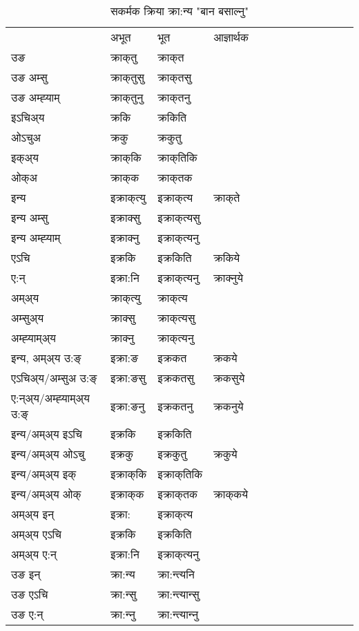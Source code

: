 \begin{table}[H]
\label{akt.vt} \centering
\caption{सकर्मक क्रिया  क्रा:न्य  "बान बसाल्नु"  }
\begin{tabular}{l|l|l|l|l|l|l|l|l|l|l|l|l}  \toprule
&अभूत & भूत & आज्ञार्थक \\ 
उङ &क्राक्‌तु &क्राक्‌त \\ 
उङ अम्सु&क्राक्‌तुसु &क्राक्‌तसु \\ 
उङ अम्ह्‍याम्&क्राक्‌तुनु &क्राक्‌तनु \\ 
इऽचिअ्य &क्रकि &क्रकिति   \\ 
ओऽचुअ        &क्रकु &क्रकुतु   \\ 
इक्अ्य&क्राक्‌कि &क्राक्‌तिकि   \\ 
ओक्अ &क्राक्‌क &क्राक्‌तक   \\ 
इन्य & इक्राक्‌त्यु  & इक्राक्‌त्य &क्राक्‌ते  \\ 
इन्य अम्सु& इक्राक्सु  & इक्राक्‌त्यसु   \\ 
इन्य अम्ह्‍याम्& इक्राक्‍नु  & इक्राक्‌त्यनु   \\ 
एऽचि & इक्रकि & इक्रकिति &क्रकिये    \\ 
ए:न् & इक्रा:नि  & इक्राक्‌त्यनु &क्राक्‍नुये  \\ 
अम्अ्य & क्राक्‌त्यु  & क्राक्‌त्य  \\ 
अम्सुअ्य & क्राक्सु & क्राक्‌त्यसु  \\ 
अम्ह्‍याम्अ्य & क्राक्‍नु  & क्राक्‌त्यनु \\ 
\midrule
इन्य, अम्अ्य उ:ङ्‌ &इक्रा:ङ &इक्रकत &क्रकये \\ 
एऽचिअ्य/अम्सुअ उ:ङ्‌ &इक्रा:ङसु &इक्रकतसु &क्रकसुये \\ 
ए:न्अ्य/अम्ह्‍याम्अ्य उ:ङ्‌ &इक्रा:ङनु &इक्रकतनु &क्रकनुये \\ 
इन्य/अम्अ्य इऽचि &इक्रकि &इक्रकिति    \\ 
इन्य/अम्अ्य ओऽचु &इक्रकु &इक्रकुतु  &क्रकुये  \\ 
इन्य/अम्अ्य इक् &इक्राक्‌कि &इक्राक्‌तिकि   \\ 
इन्य/अम्अ्य ओक् &इक्राक्‌क &इक्राक्‌तक  &क्राक्‌कये  \\ 
अम्अ्य इन् & इक्रा: & इक्राक्‌त्य   \\ 
अम्अ्य एऽचि & इक्रकि & इक्रकिति    \\ 
अम्अ्य ए:न् & इक्रा:नि  & इक्राक्‌त्यनु  \\ 
\midrule
उङ इन् & क्रा:न्य  & क्रा:न्त्यनि  \\ 
उङ एऽचि & क्रा:न्सु  & क्रा:न्त्यान्सु   \\ 
उङ ए:न्& क्रा:न्‍नु  & क्रा:न्त्यान्‍नु   \\ 
\bottomrule
\end{tabular}
\end{table}


